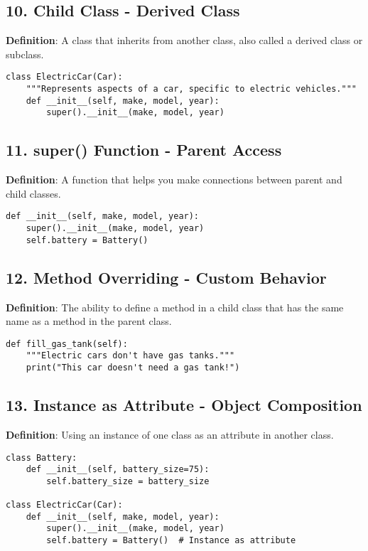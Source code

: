 \subsection*{10. Child Class - Derived Class}
\textbf{Definition}: A class that inherits from another class, also called a derived class or subclass.

\begin{lstlisting}
class ElectricCar(Car):
    """Represents aspects of a car, specific to electric vehicles."""
    def __init__(self, make, model, year):
        super().__init__(make, model, year)
\end{lstlisting}

\subsection*{11. super() Function - Parent Access}
\textbf{Definition}: A function that helps you make connections between parent and child classes.

\begin{lstlisting}
def __init__(self, make, model, year):
    super().__init__(make, model, year)
    self.battery = Battery()
\end{lstlisting}

\subsection*{12. Method Overriding - Custom Behavior}
\textbf{Definition}: The ability to define a method in a child class that has the same name as a method in the parent class.

\begin{lstlisting}
def fill_gas_tank(self):
    """Electric cars don't have gas tanks."""
    print("This car doesn't need a gas tank!")
\end{lstlisting}

\subsection*{13. Instance as Attribute - Object Composition}
\textbf{Definition}: Using an instance of one class as an attribute in another class.

\begin{lstlisting}
class Battery:
    def __init__(self, battery_size=75):
        self.battery_size = battery_size

class ElectricCar(Car):
    def __init__(self, make, model, year):
        super().__init__(make, model, year)
        self.battery = Battery()  # Instance as attribute
\end{lstlisting}

